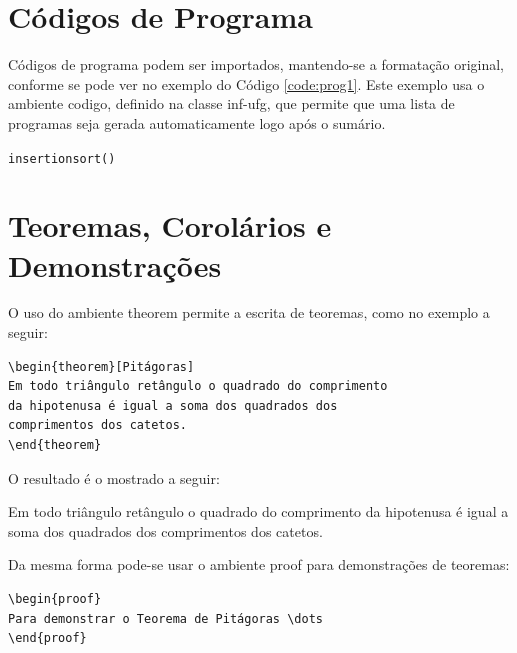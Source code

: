 \section{Códigos de Programa}
\label{sec:progs} 
Códigos de programa podem ser importados, mantendo-se a formatação original, conforme se pode ver no exemplo do Código \ref{code:prog1}. Este exemplo usa o ambiente \textsf{codigo}, definido na classe \textsf{inf-ufg}, que permite que uma lista de programas seja gerada automaticamente logo após o sumário.
\begin{center}
 \begin{minipage}{0.7\textwidth}
  \begin{codigo}[H]
   \small
   \caption{\texttt{insertionsort()} }
   \label{code:prog1}
  \end{codigo}
 \end{minipage}
\end{center}

\section{Teoremas, Corolários e Demonstrações}
\label{sec:teor}
 O uso do ambiente \textsf{theorem} permite a escrita de teoremas, como no exemplo a seguir:
\begin{verbatim}
\begin{theorem}[Pitágoras]
Em todo triângulo retângulo o quadrado do comprimento
da hipotenusa é igual a soma dos quadrados dos
comprimentos dos catetos.
\end{theorem}
\end{verbatim}

O resultado é o mostrado a seguir:

\begin{theorem}[Pitágoras]
Em todo triângulo retângulo o quadrado do comprimento da hipotenusa é igual a soma dos quadrados dos comprimentos dos catetos.
\end{theorem}

Da mesma forma pode-se usar o ambiente \textsf{proof} para demonstrações de teoremas:
\begin{verbatim}
\begin{proof}
Para demonstrar o Teorema de Pitágoras \dots
\end{proof}
\end{verbatim}

